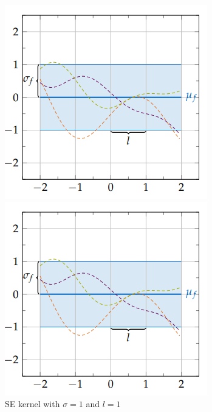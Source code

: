 \documentclass[12pt,a4paper]{report}
\theoremstyle{definition}
\begin{document}
\begin{figure}[H]
   	 \begin{minipage}[t]{0.3\textwidth}
	 	\includegraphics[width=\linewidth]{RBF_sigma_1_lengthscale_1.png}
	    	\caption{SE kernel with $\sigma=1$ and $l=1$ \citep{Kaiser2017}}
	    	\label{fig:SEKernSig1Length1}
	\end{minipage}
	\hfill
	\begin{minipage}[t]{0.3\textwidth}
	 	\includegraphics[width=\linewidth]{RBF_sigma_1_lengthscale_1.png}

\end{minipage}
\end{figure}
\end{document}
